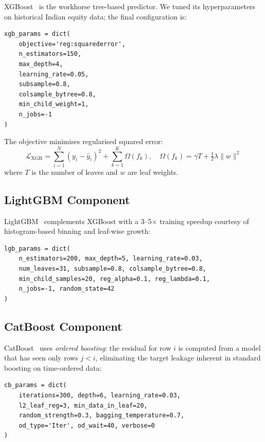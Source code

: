 \documentclass[10pt,a4paper,twoside]{article}
\begin{document}
XGBoost~\cite{chen2016} is the workhorse tree-based predictor. We tuned its
hyperparameters on historical Indian equity data; the final configuration is:

\begin{lstlisting}[caption={XGBoost configuration.}]
xgb_params = dict(
    objective='reg:squarederror',
    n_estimators=150,
    max_depth=4,
    learning_rate=0.05,
    subsample=0.8,
    colsample_bytree=0.8,
    min_child_weight=1,
    n_jobs=-1
)
\end{lstlisting}

The objective minimises regularised squared error:
\begin{equation}
  \mathcal{L}_{\text{XGB}} = \sum_{i=1}^{N}(y_i - \hat{y}_i)^2 + \sum_{k=1}^{K}\Omega(f_k),
  \quad \Omega(f_k) = \gamma T + \tfrac{1}{2}\lambda\|w\|^2
\end{equation}
where $T$ is the number of leaves and $w$ are leaf weights.

\subsection{LightGBM Component}

LightGBM~\cite{ke2017} complements XGBoost with a 3--5$\times$ training
speedup courtesy of histogram-based binning and leaf-wise growth:
\begin{lstlisting}[caption={LightGBM configuration.}]
lgb_params = dict(
    n_estimators=200, max_depth=5, learning_rate=0.03,
    num_leaves=31, subsample=0.8, colsample_bytree=0.8,
    min_child_samples=20, reg_alpha=0.1, reg_lambda=0.1,
    n_jobs=-1, random_state=42
)
\end{lstlisting}

\subsection{CatBoost Component}

CatBoost~\cite{prokhorenkova2018} uses \emph{ordered boosting}: the residual
for row $i$ is computed from a model that has seen only rows $j < i$,
eliminating the target leakage inherent in standard boosting on time-ordered
data:
\begin{lstlisting}[caption={CatBoost configuration.}]
cb_params = dict(
    iterations=300, depth=6, learning_rate=0.03,
    l2_leaf_reg=3, min_data_in_leaf=20,
    random_strength=0.3, bagging_temperature=0.7,
    od_type='Iter', od_wait=40, verbose=0
)
\end{lstlisting}
\end{document}
